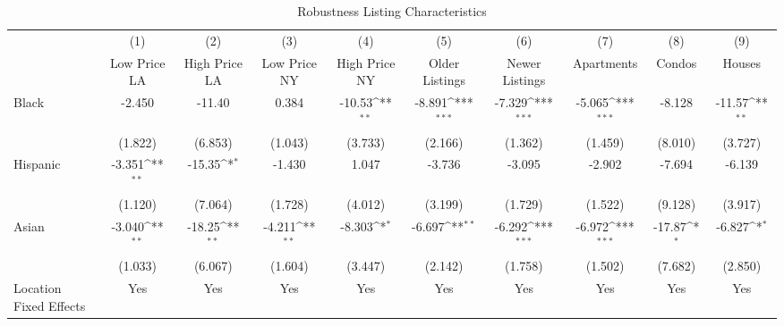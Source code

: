 \begin{table}[htbp]\centering
\def\sym#1{\ifmmode^{#1}\else\(^{#1}\)\fi}
\caption{Robustness Listing Characteristics}
\begin{tabular}{l*{9}{c}}
\hline\hline
                    &\multicolumn{1}{c}{(1)}&\multicolumn{1}{c}{(2)}&\multicolumn{1}{c}{(3)}&\multicolumn{1}{c}{(4)}&\multicolumn{1}{c}{(5)}&\multicolumn{1}{c}{(6)}&\multicolumn{1}{c}{(7)}&\multicolumn{1}{c}{(8)}&\multicolumn{1}{c}{(9)}\\
                    &\multicolumn{1}{c}{Low Price LA}&\multicolumn{1}{c}{High Price LA}&\multicolumn{1}{c}{Low Price NY}&\multicolumn{1}{c}{High Price NY}&\multicolumn{1}{c}{Older Listings}&\multicolumn{1}{c}{Newer Listings}&\multicolumn{1}{c}{Apartments}&\multicolumn{1}{c}{Condos}&\multicolumn{1}{c}{Houses}\\
\hline
Black               &      -2.450         &      -11.40         &       0.384         &      -10.53\sym{**} &      -8.891\sym{***}&      -7.329\sym{***}&      -5.065\sym{***}&      -8.128         &      -11.57\sym{**} \\
                    &     (1.822)         &     (6.853)         &     (1.043)         &     (3.733)         &     (2.166)         &     (1.362)         &     (1.459)         &     (8.010)         &     (3.727)         \\
[1em]
Hispanic            &      -3.351\sym{**} &      -15.35\sym{*}  &      -1.430         &       1.047         &      -3.736         &      -3.095         &      -2.902         &      -7.694         &      -6.139         \\
                    &     (1.120)         &     (7.064)         &     (1.728)         &     (4.012)         &     (3.199)         &     (1.729)         &     (1.522)         &     (9.128)         &     (3.917)         \\
[1em]
Asian               &      -3.040\sym{**} &      -18.25\sym{**} &      -4.211\sym{**} &      -8.303\sym{*}  &      -6.697\sym{**} &      -6.292\sym{***}&      -6.972\sym{***}&      -17.87\sym{*}  &      -6.827\sym{*}  \\
                    &     (1.033)         &     (6.067)         &     (1.604)         &     (3.447)         &     (2.142)         &     (1.758)         &     (1.502)         &     (7.682)         &     (2.850)         \\
\hline
Location Fixed Effects&         Yes         &         Yes         &         Yes         &         Yes         &         Yes         &         Yes         &         Yes         &         Yes         &         Yes         \\

\end{tabular}
\end{table}
